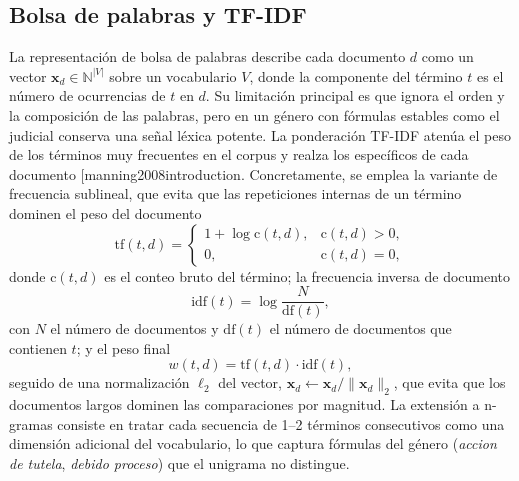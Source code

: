 \documentclass[11pt]{tg_usta}
\makeatletter
\renewcommand{\cite}{\@ifnextchar[{\@tempswatrue\@citex}{\@tempswafalse\@citex[]}}
\makeatother
\begin{document}
\subsection{Bolsa de palabras y TF-IDF}
La representación de bolsa de palabras describe cada documento $d$ como un vector $\mathbf{x}_d \in \mathbb{N}^{|V|}$ sobre un vocabulario $V$, donde la componente del término $t$ es el número de ocurrencias de $t$ en $d$. Su limitación principal es que ignora el orden y la composición de las palabras, pero en un género con fórmulas estables como el judicial conserva una señal léxica potente. La ponderación TF-IDF atenúa el peso de los términos muy frecuentes en el corpus y realza los específicos de cada documento \cite{manning2008introduction}. Concretamente, se emplea la variante de frecuencia sublineal, que evita que las repeticiones internas de un término dominen el peso del documento
\begin{equation}
\mathrm{tf}(t,d) =
\begin{cases}
1 + \log \mathrm{c}(t,d), & \mathrm{c}(t,d) > 0,\\
0, & \mathrm{c}(t,d) = 0,
\end{cases}
\label{eq:tf}
\end{equation}
donde $\mathrm{c}(t,d)$ es el conteo bruto del término; la frecuencia inversa de documento
\begin{equation}
\mathrm{idf}(t) = \log \frac{N}{\mathrm{df}(t)},
\label{eq:idf}
\end{equation}
con $N$ el número de documentos y $\mathrm{df}(t)$ el número de documentos que contienen $t$; y el peso final
\begin{equation}
w(t,d) = \mathrm{tf}(t,d)\cdot \mathrm{idf}(t),
\label{eq:tfidf}
\end{equation}
seguido de una normalización $\ell_2$ del vector, $\mathbf{x}_d \leftarrow \mathbf{x}_d / \lVert \mathbf{x}_d \rVert_2$, que evita que los documentos largos dominen las comparaciones por magnitud. La extensión a n-gramas consiste en tratar cada secuencia de 1--2 términos consecutivos como una dimensión adicional del vocabulario, lo que captura fórmulas del género (\emph{accion de tutela}, \emph{debido proceso}) que el unigrama no distingue.
\end{document}
